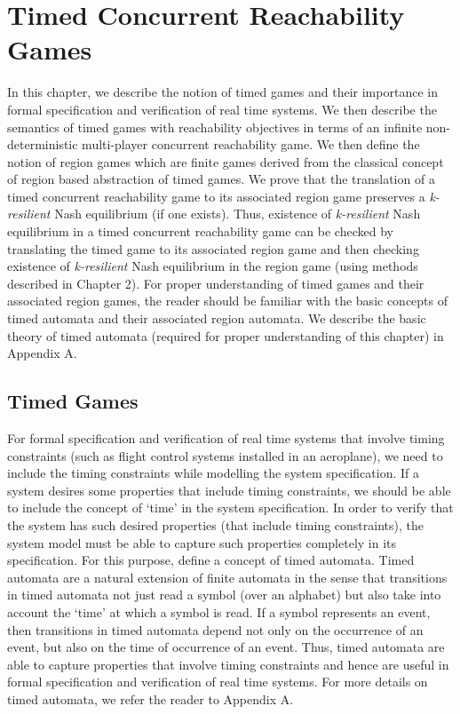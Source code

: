 \chapter{Timed Concurrent Reachability Games}

In this chapter, we describe the notion of timed games and their importance in formal specification and verification of real time systems. We then describe the semantics of timed games with reachability objectives in terms of an infinite non-deterministic multi-player concurrent reachability game. We then define the notion of region games which are finite games derived from the classical concept of region based abstraction of timed games. We prove that the translation of a timed concurrent reachability game to its associated region game preserves a \textit{k-resilient} Nash equilibrium (if one exists). Thus, existence of \textit{k-resilient} Nash equilibrium in a timed concurrent reachability game can be checked by translating the timed game to its associated region game and then checking existence of \textit{k-resilient} Nash equilibrium in the region game (using methods described in Chapter 2). For proper understanding of timed games and their associated region games, the reader should be familiar with the basic concepts of timed automata and their associated region automata. We describe the basic theory of timed automata (required for proper understanding of this chapter) in Appendix A.

\section{Timed Games}

For formal specification and verification of real time systems that involve timing constraints (such as flight control systems installed in an aeroplane), we need to include the timing constraints while modelling the system specification. If a system desires some properties that include timing constraints, we should be able to include the concept of `time' in the system specification. In order to verify that the system has such desired properties (that include timing constraints), the system model must be able to capture such properties completely in its specification. For this purpose, \citet{1} define a concept of timed automata. Timed automata are a natural extension of finite automata in the sense that transitions in timed automata not just read a symbol (over an alphabet) but also take into account the `time' at which a symbol is read. If a symbol represents an event, then transitions in timed automata depend not only on the occurrence of an event, but also on the time of occurrence of an event. Thus, timed automata are able to capture properties that involve timing constraints and hence are useful in formal specification and verification of real time systems. For more details on timed automata, we refer the reader to Appendix A.

